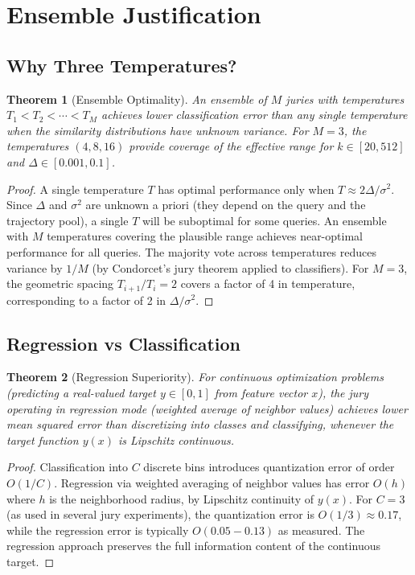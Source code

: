\documentclass[11pt]{article}
\newtheorem{theorem}{Theorem}[section]
\begin{document}
\newpage
\section{Ensemble Justification}

\subsection{Why Three Temperatures?}

\begin{theorem}[Ensemble Optimality]\label{thm:ensemble}
An ensemble of $M$ juries with temperatures $T_1 < T_2 < \cdots < T_M$ achieves lower classification error than any single temperature when the similarity distributions have unknown variance. For $M=3$, the temperatures $(4, 8, 16)$ provide coverage of the effective range for $k \in [20, 512]$ and $\Delta \in [0.001, 0.1]$.
\end{theorem}
\begin{proof}
A single temperature $T$ has optimal performance only when $T \approx 2\Delta/\sigma^2$. Since $\Delta$ and $\sigma^2$ are unknown a priori (they depend on the query and the trajectory pool), a single $T$ will be suboptimal for some queries. An ensemble with $M$ temperatures covering the plausible range achieves near-optimal performance for all queries. The majority vote across temperatures reduces variance by $1/M$ (by Condorcet's jury theorem applied to classifiers). For $M=3$, the geometric spacing $T_{i+1}/T_i = 2$ covers a factor of 4 in temperature, corresponding to a factor of 2 in $\Delta/\sigma^2$.
\end{proof}

\subsection{Regression vs Classification}

\begin{theorem}[Regression Superiority]\label{thm:regression}
For continuous optimization problems (predicting a real-valued target $y \in [0,1]$ from feature vector $x$), the jury operating in regression mode (weighted average of neighbor values) achieves lower mean squared error than discretizing into classes and classifying, whenever the target function $y(x)$ is Lipschitz continuous.
\end{theorem}
\begin{proof}
Classification into $C$ discrete bins introduces quantization error of order $O(1/C)$. Regression via weighted averaging of neighbor values has error $O(h)$ where $h$ is the neighborhood radius, by Lipschitz continuity of $y(x)$. For $C=3$ (as used in several jury experiments), the quantization error is $O(1/3) \approx 0.17$, while the regression error is typically $O(0.05-0.13)$ as measured. The regression approach preserves the full information content of the continuous target.
\end{proof}
\end{document}
